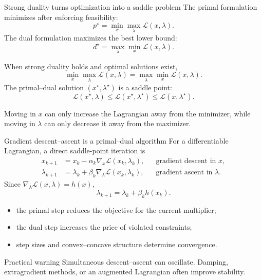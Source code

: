 \documentclass[aspectratio=169,11pt]{beamer}
\newcommand{\grad}{\nabla}
\begin{document}
\begin{frame}{Strong duality turns optimization into a saddle problem}
  The primal formulation minimizes after enforcing feasibility:
  \[
    p^\star=\min_x\max_\lambda \mathcal L(x,\lambda).
  \]
  The dual formulation maximizes the best lower bound:
  \[
    d^\star=\max_\lambda\min_x \mathcal L(x,\lambda).
  \]

  When strong duality holds and optimal solutions exist,
  \[
    \boxed{
      \min_x\max_\lambda \mathcal L(x,\lambda)
      =\max_\lambda\min_x \mathcal L(x,\lambda).}
  \]
  The primal--dual solution $(x^\star,\lambda^\star)$ is a saddle point:
  \[
    \mathcal L(x^\star,\lambda)
    \leq \mathcal L(x^\star,\lambda^\star)
    \leq \mathcal L(x,\lambda^\star).
  \]

  Moving in $x$ can only increase the Lagrangian away from the minimizer, while
  moving in $\lambda$ can only decrease it away from the maximizer.
\end{frame}

\begin{frame}{Gradient descent--ascent is a primal--dual algorithm}
  For a differentiable Lagrangian, a direct saddle-point iteration is
  \[
    \boxed{
    \begin{aligned}
      x_{k+1}&=x_k-\alpha_k\grad_x\mathcal L(x_k,\lambda_k),
      &&\text{gradient descent in }x,\\
      \lambda_{k+1}&=\lambda_k+\beta_k\grad_\lambda
        \mathcal L(x_k,\lambda_k),
      &&\text{gradient ascent in }\lambda.
    \end{aligned}}
  \]
  Since $\grad_\lambda\mathcal L(x,\lambda)=h(x)$,
  \[
    \lambda_{k+1}=\lambda_k+\beta_k h(x_k).
  \]

  \begin{itemize}
    \item the primal step reduces the objective for the current multiplier;
    \item the dual step increases the price of violated constraints;
    \item step sizes and convex--concave structure determine convergence.
  \end{itemize}

  \begin{alertblock}{Practical warning}
    Simultaneous descent--ascent can oscillate. Damping, extragradient methods,
    or an augmented Lagrangian often improve stability.
  \end{alertblock}
\end{frame}
\end{document}
